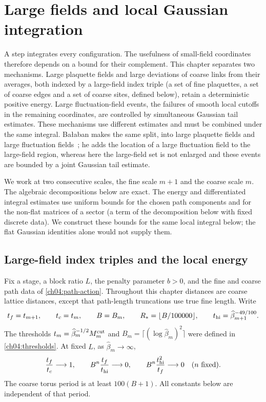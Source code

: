 \chapter{Large fields and local Gaussian integration}
\label{ch06:large-fields}

A step integrates every configuration. The usefulness of
small-field coordinates therefore depends on a bound for their complement.
This chapter separates two mechanisms. Large plaquette fields and
large deviations of coarse links from their averages, both indexed by a large-field index triple (a set of fine plaquettes, a set of coarse edges and a set of coarse sites, defined below), retain a deterministic positive energy.
Large fluctuation-field events, the failures of smooth local cutoffs in the remaining coordinates, are controlled
by simultaneous Gaussian tail estimates. These mechanisms use different
estimates and must be combined under the same integral. Ba{\l}aban makes the same split, into large plaquette fields and large fluctuation fields~\cite{Balaban1988Expansions}; he adds the location of a large fluctuation field to the large-field region, whereas here the large-field set is not enlarged and these events are bounded by a joint Gaussian tail estimate.

We work at two consecutive scales, the fine scale $m+1$ and the coarse scale $m$. The algebraic decompositions below
are exact. The energy and differentiated integral estimates use
uniform bounds for the chosen path components and for the non-flat matrices of a sector (a term of the decomposition below with fixed discrete data).
We construct these bounds for the same local integral below; the flat
Gaussian identities alone would not supply them.

\section{Large-field index triples and the local energy}

Fix a stage, a block ratio $L$, the penalty parameter $b>0$, and the fine and coarse
path data of \eqref{ch04:path-action}. Throughout this chapter distances
are coarse lattice distances, except that path-length truncations use true fine
length. Write
\[
 t_f=t_{m+1},\qquad t_c=t_m,\qquad B=B_m,\qquad
 R_*=\lfloor B/100000\rfloor,\qquad
 t_{\rm hi}=\widehat\beta_{m+1}^{-49/100}.
\]
The thresholds $t_m=\widehat\beta_m^{-1/2}M_m^{\rm cut}$ and
$B_m=\lceil(\log\widehat\beta_m)^2\rceil$ were defined in
\eqref{ch04:thresholds}. At fixed $L$, as $\widehat\beta_m\to\infty$,
\begin{equation}
 \frac{t_f}{t_c}\longrightarrow1,\qquad
 B^n\frac{t_f}{t_{\rm hi}}\longrightarrow0,\qquad
 B^n\frac{t_{\rm hi}^2}{t_f}\longrightarrow0
 \quad(n\text{ fixed}).
 \label{ch06:scales}
\end{equation}
The coarse torus period is at least $100(B+1)$. All constants below are
independent of that period.

